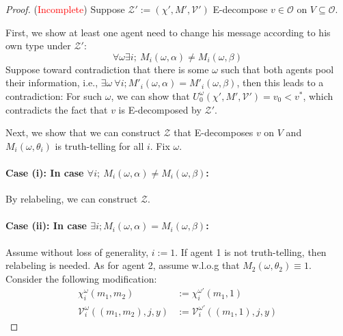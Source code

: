 \documentclass[11pt,a4paper,dvipdfmx]{article}
\newcommand{\mO}{\mathcal{O}}
\newcommand{\mV}{\mathcal{V}}
\newcommand{\mZ}{\mathcal{Z}}
\newcommand{\1}{\mathbbm{1}}
\newcommand{\ocomment}[1]{{\textcolor{red}{#1}}}
\begin{document}
\begin{proof}(\ocomment{Incomplete})
	Suppose $\mZ' := (\chi', M', \mV')$ E-decompose $v \in \mO$ on $V \subseteq \mO$.
	
	First, we show at least one agent need to change his message according to his own type under $\mZ'$:
	$$
	\forall \omega \exists i; \ M_i(\omega, \alpha) \neq M_i(\omega, \beta)
	$$
	Suppose toward contradiction that there is some $\omega$ such that both agents pool their information, i.e., $\exists \omega \ \forall i; M'_i(\omega, \alpha) = M'_i(\omega, \beta)$, then this leads to a contradiction: For such $\omega$, we can show that $U_0^\omega(\chi', M', \mV') = v_0 < v^*$, which contradicts the fact that $v$ is E-decomposed by $\mZ'$.
	
	Next, we show that we can construct $\mZ$ that E-decomposes $v$ on $V$ and $M_i(\omega, \theta_i)$ is truth-telling for all $i$. Fix $\omega$.
	\paragraph{Case (i): In case $\forall i; \ M_i(\omega, \alpha) \neq M_i(\omega, \beta)$:}
	By relabeling, we can construct $\mZ$.
	\paragraph{Case (ii): In case $\exists i; M_i(\omega, \alpha) = M_i(\omega, \beta)$:} Assume without loss of generality, $i:=1$. If agent 1 is not truth-telling, then relabeling is needed. As for agent 2, assume w.l.o.g that $M_2(\omega, \theta_2) \equiv 1$. Consider the following modification:
	\begin{align*}
		\chi_i^{\omega}(m_1, m_2) &:= \chi_i^{\omega'}(m_1, 1) \\
		\mV_i^{\omega}((m_1, m_2), j, y) &:= \mV_i^{\omega'}((m_1, 1), j, y)
	\end{align*}
	
	
	
\end{proof}
\end{document}
